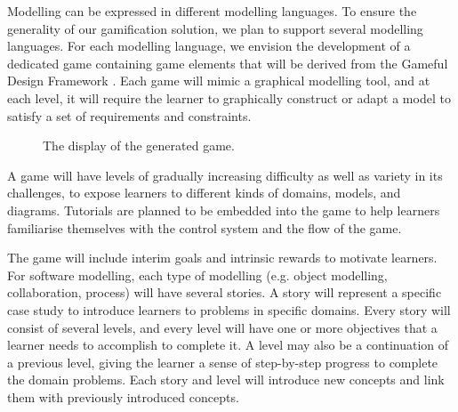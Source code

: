 \documentclass[12pt, a4paper]{report}
\begin{document}
Modelling can be expressed in different modelling languages. To ensure the generality of our gamification solution, we plan to support several modelling languages. For each modelling language, we envision the development of a dedicated game containing game elements that will be derived from the Gameful Design Framework \cite{deterding2015lens}. Each game will mimic a graphical modelling tool, and at each level, it will require the learner to graphically construct or adapt a model to satisfy a set of requirements and constraints.

\begin{figure}[ht]
\centering
{}
\caption{The display of the generated game.}
\label{fig:001}
\end{figure}

A game will have levels of gradually increasing difficulty as well as variety in its challenges, to expose learners to different kinds of domains, models, and diagrams. Tutorials are planned to be embedded into the game to help learners familiarise themselves with the control system and the flow of the game. 

The game will include interim goals and intrinsic rewards to motivate learners. For software modelling, each type of modelling (e.g. object modelling, collaboration, process) will have several stories. A story will represent a specific case study to introduce learners to problems in specific domains. Every story will consist of several levels, and every level will have one or more objectives that a learner needs to accomplish to complete it. A level may also be a continuation of a previous level, giving the learner a sense of step-by-step progress to complete the domain problems. Each story and level will introduce new concepts and link them with previously introduced concepts.
\end{document}
